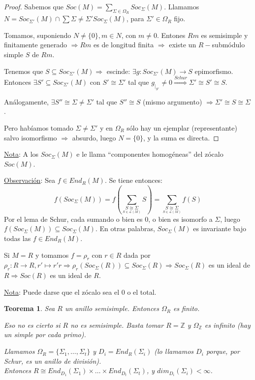 \documentclass[11pt,a4paper]{article}
\theoremstyle{break}
\newtheorem{theorem}{Teorema}[section]
\begin{document}
\begin{proof}
Sabemos que $Soc(M) = \sum\limits_{\Sigma \in \Omega_{R}} Soc_{\Sigma}(M)$. Llamamos $N = Soc_{\Sigma'}(M) \cap \sum\limits{\Sigma \neq \Sigma'} Soc_{\Sigma}(M)$, para $\Sigma' \in \Omega_{R}$ fijo.

Tomamos, suponiendo $N \neq \{0\}, m \in N$, con $m \neq 0$. Entones $Rm$ es semisimple y finitamente generado $\Rightarrow Rm$ es de longitud finita $\Rightarrow$ existe un $R-$submódulo simple $S$ de $Rm$.

Tenemos que $S \subseteq Soc_{\Sigma'}(M) \Rightarrow$ escinde: $\exists g: Soc_{\Sigma'}(M) \to S$ epimorfismo. \\
Entonces $\exists S' \subseteq Soc_{\Sigma'}(M)$ con $S' \cong \Sigma'$ tal que $g_{\mid_{S'}} \neq 0 \overset{Schur}{\Rightarrow} \Sigma' \cong S' \cong S$.

Análogamente, $\exists S'' \cong \Sigma \neq \Sigma'$ tal que $S'' \cong S$ (mismo argumento) $\Rightarrow \Sigma' \cong S \cong \Sigma$.

Pero habíamos tomado $\Sigma \neq \Sigma'$ y en $\Omega_{R}$ sólo hay un ejemplar (representante) salvo isomorfismo $\Rightarrow$ absurdo, luego $N = \{0\}$, y la suma es directa.
\end{proof}

\underline{Nota}: A los $Soc_{\Sigma}(M)$ e le llama ``componentes homogéneas'' del zócalo $Soc(M)$.


\underline{Observación}: Sea $f \in End_{R}(M)$. Se tiene entonces:
$$f(Soc_{\Sigma}(M)) = f(\sum\limits_{\underset{S \in \mathcal{L}(M)}{S \cong \Sigma}} S) = \sum\limits_{\underset{S \in \mathcal{L}(M)}{S \cong \Sigma}} f(S)$$
Por el lema de Schur, cada sumando o bien es 0, o bien es isomorfo a $\Sigma$, luego $f(Soc_{\Sigma}(M)) \subseteq Soc_{\Sigma}(M)$. En otras palabras, $Soc_{\Sigma}(M)$ es invariante bajo todas las $f \in End_{R}(M)$.

Si $M = R$ y tomamos $f = \rho_{r}$ con $r \in R$ dada por $\rho_{r}: R \to R, r' \mapsto r'r \Rightarrow \rho_{r}(Soc_{\Sigma}(R)) \subseteq Soc_{\Sigma}(R) \Rightarrow Soc_{\Sigma}(R)$ es un ideal de $R \Rightarrow Soc(R)$ es un ideal de $R$.

\underline{Nota}: Puede darse que el zócalo sea el 0 o el total.

\begin{theorem}
Sea $R$ un anillo semisimple. Entonces $\Omega_{R}$ es finito.

Eso no es cierto si $R$ no es semisimple. Basta tomar $R = \mathbb{Z}$ y $\Omega_{\mathbb{Z}}$ es infinito (hay un simple por cada primo).

Llamamos $\Omega_{R} = \{\Sigma_{1}, \dots, \Sigma_{t}\}$ y $D_{i} = End_{R}(\Sigma_{i})$ (lo llamamos $D_{i}$ porque, por Schur, es un anillo de división). \\
Entonces $R \cong End_{D_{1}}(\Sigma_{1}) \times \dots \times End_{D_{t}}(\Sigma_{t})$, y $dim_{D_{i}}(\Sigma_{i}) < \infty$.
\end{theorem}
\end{document}
